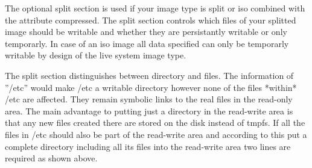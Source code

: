 The optional split section is used if your image type is split or iso
combined with the attribute compressed. The split
section controls which files of your splitted image should be writable
and whether they are persistantly writable or only temporarly. In case
of an iso image all data specified can only be temporarly writable
by design of the live system image type.

The split section distinguishes between directory and files. The
information of ''/etc'' would make /etc a writable directory however
none of the files *within* /etc are affected. They remain symbolic
links to the real files in the read-only area. The main advantage to
putting just a directory in the read-write area is that any new
files created there are stored on the disk instead of tmpfs. If all
the files in /etc should also be part of the read-write area and
according to this put a complete directory including all its files
into the read-write area two lines are required as shown above.

